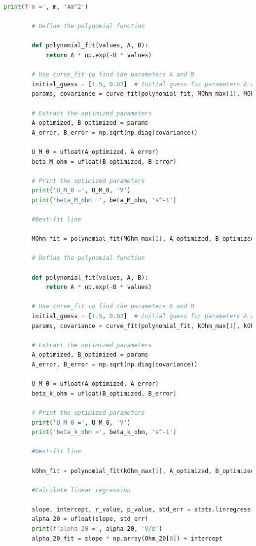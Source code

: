 \documentclass[a4paper,11pt]{article}
\begin{document}
\begin{lstlisting}[language=Python, basicstyle=\tiny, breaklines=true, postbreak=\mbox{\textbackslashspace}]
        print(f'm =', m, 'Am^2')

        # Define the polynomial function

        def polynomial_fit(values, A, B):
            return A * np.exp(-B * values)

        # Use curve_fit to find the parameters A and B
        initial_guess = [1.5, 0.02]  # Initial guess for parameters A and B
        params, covariance = curve_fit(polynomial_fit, MOhm_max[1], MOhm_max[2], p0=initial_guess)

        # Extract the optimized parameters
        A_optimized, B_optimized = params
        A_error, B_error = np.sqrt(np.diag(covariance))

        U_M_0 = ufloat(A_optimized, A_error)
        beta_M_ohm = ufloat(B_optimized, B_error)

        # Print the optimized parameters
        print('U_M_0 =', U_M_0, 'V')
        print('beta_M_ohm =', beta_M_ohm, 's^-1')

        #Best-fit line

        MOhm_fit = polynomial_fit(MOhm_max[1], A_optimized, B_optimized)

        # Define the polynomial function

        def polynomial_fit(values, A, B):
            return A * np.exp(-B * values)

        # Use curve_fit to find the parameters A and B
        initial_guess = [1.5, 0.02]  # Initial guess for parameters A and B
        params, covariance = curve_fit(polynomial_fit, kOhm_max[1], kOhm_max[2], p0=initial_guess)

        # Extract the optimized parameters
        A_optimized, B_optimized = params
        A_error, B_error = np.sqrt(np.diag(covariance))

        U_M_0 = ufloat(A_optimized, A_error)
        beta_k_ohm = ufloat(B_optimized, B_error)

        # Print the optimized parameters
        print('U_M_0 =', U_M_0, 'V')
        print('beta_k_ohm =', beta_k_ohm, 's^-1')

        #Best-fit line

        kOhm_fit = polynomial_fit(kOhm_max[1], A_optimized, B_optimized)

        #Calculate linear regression

        slope, intercept, r_value, p_value, std_err = stats.linregress(Ohm_20[0], Ohm_20['U_ind'])
        alpha_20 = ufloat(slope, std_err)
        print(f'alpha_20 =', alpha_20, 'V/s')
        alpha_20_fit = slope * np.array(Ohm_20[0]) + intercept


\end{lstlisting}
\end{document}
